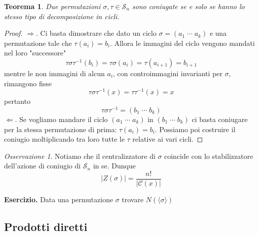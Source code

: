 \documentclass[a4paper]{article}
\newtheorem{theorem}{Teorema}[section]
\theoremstyle{remark}
\newtheorem*{remark}{Osservazione}
\theoremstyle{definition}
\begin{document}
\begin{multicols}{2}
\begin{theorem}
	Due permutazioni $ \sigma, \tau \in \mathcal{S}_n $ sono coniugate se e solo se hanno lo stesso tipo di decomposizione in cicli.
\end{theorem}
\begin{proof}
	$ \Rightarrow  $. Ci basta dimostrare che dato un ciclo $ \sigma = (a_1 \; \cdots \; a_k) $ e una permutazione tale che $ \tau(a_i) = b_i $. Allora le immagini del ciclo vengono mandati nel loro "successore" \[ \tau\sigma\tau^{-1} (b_i) = \tau\sigma(a_i) = \tau(a_{i+1}) = b_{i+1} \] mentre le non immagini di alcun $ a_i $, con controimmagini invarianti per $ \sigma $, rimangono fisse \[ \tau\sigma\tau^{-1} (x) = \tau\tau^{-1}(x) = x \]
	pertanto \[\tau\sigma\tau^{-1} = (b_1 \; \cdots \; b_k) \]
	$ \Leftarrow $. Se vogliamo mandare il ciclo $ (a_1 \; \cdots \; a_k) $ in $ (b_1 \; \cdots \; b_k) $ ci basta coniugare per la stessa permutazione di prima: $ \tau(a_i) = b_i $. Possiamo poi costruire il coniugio moltiplicando tra loro tutte le $ \tau $ relative ai vari cicli.
\end{proof}

\begin{remark}
	Notiamo che il centralizzatore di $ \sigma $ coincide con lo stabilizzatore dell'azione di coniugio di $ \mathcal{S}_n $ in se. Dunque
	\[ |Z(\sigma)| = \frac{n!}{|\mathcal{C}(x)|} \]
\end{remark}
\textbf{Esercizio.} Data una permutazione $ \sigma $ trovare $ N(\langle \sigma \rangle) $

\end{multicols}
\subsection{Prodotti diretti}
\end{document}

